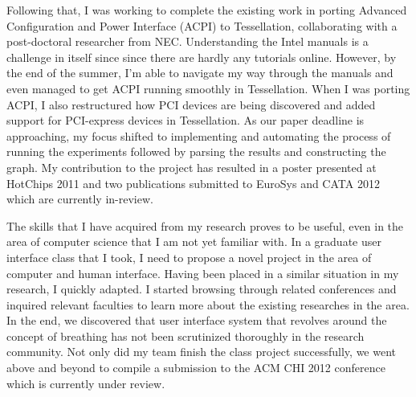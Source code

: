 \documentclass[11pt]{article}
\begin{document}
Following that, I was working to complete the existing work in porting Advanced Configuration and Power Interface (ACPI) to Tessellation, collaborating with a post-doctoral researcher from NEC. Understanding the Intel manuals is a challenge in itself since since there are hardly any tutorials online. However, by the end of the summer, I'm able to navigate my way through the manuals and even managed to get ACPI running smoothly in Tessellation. When I was porting ACPI, I also restructured how PCI devices are being discovered and added support for PCI-express devices in Tessellation. As our paper deadline is approaching, my focus shifted to implementing and automating the process of running the experiments followed by parsing the results and constructing the graph. My contribution to the project has resulted in a poster presented at HotChips 2011 and two publications submitted to EuroSys and CATA 2012 which are currently in-review. \newline

The skills that I have acquired from my research proves to be useful, even in the area of computer science that I am not yet familiar with. In a graduate user interface class that I took, I need to propose a novel project in the area of computer and human interface. Having been placed in a similar situation in my research, I quickly adapted. I started browsing through related conferences and inquired relevant faculties to learn more about the existing researches in the area. In the end, we discovered that user interface system that revolves around the concept of breathing has not been scrutinized thoroughly in the research community. Not only did my team finish the class project successfully, we went above and beyond to compile a submission to the ACM CHI 2012 conference which is currently under review. \newline


\end{document}
